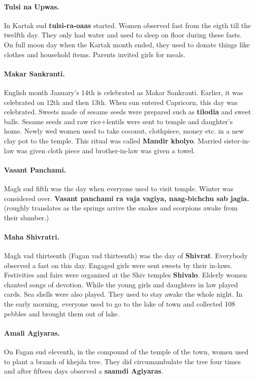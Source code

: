 \paragraph{Tulsi na Upwas.} In Kartak sud \textbf{tulsi-ra-oaas} started. Women
observed fast from the eigth till the twelfth day. They only had water and used
to sleep on floor during these fasts. On full moon day when the Kartak month
ended, they used to donate things like clothes and household items. Parents
invited girls for meals.  \paragraph{Makar Sankranti.} English month January's
14th is celebrated as Makar Sankranti. Earlier, it was celebrated on 12th and
then 13th. When sun entered Capricorn, this day was celebrated. Sweets made of
sesame seeds were prepared such as \textbf{tilodia} and sweet balls. Sesame
seeds and raw rice+lentils were sent to temple and daughter's home. Newly wed
women used to take coconut, clothpiece, money etc. in a new clay pot to the
temple. This ritual was called \textbf{Mandir kholyo}. Married sister-in-law
was given cloth piece and brother-in-law was given a towel.  \paragraph{Vasant
Panchami.} Magh sud fifth was the day when everyone used to visit temple.
Winter was considered over. \textbf{Vasant panchami ra vaja vagiya,
naag-bichchu sab jagia.} (roughly translates as the springs arrive the snakes
and scorpions awake from their slumber.) \paragraph{Maha Shivratri.} Magh vad
thirteenth (Fagan vad thirteenth) was the day of \textbf{Shivrat}. Everybody
observed a fast on this day. Engaged girls were sent sweets by their in-laws.
Festivities and fairs were organized at the Shiv temples \textbf{Shivalo}.
Elderly women chanted songs of devotion. While the young girls and daughters in
law played cards. Sea shells were also played. They used to stay awake the
whole night. In the early morning, everyone used to go to the lake of town and
collected 108 pebbles and brought them out of lake.  \paragraph{Amali
Agiyaras.} On Fagan sud eleventh, in the compound of the temple of the town,
women used to plant a branch of khejda tree. They did circumambulate the tree
four times and after fifteen days observed a \textbf{saamdi Agiyaras}.
